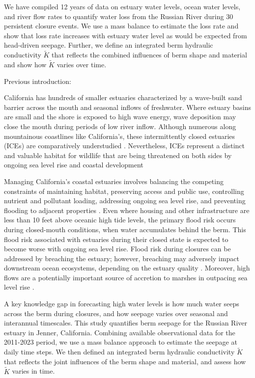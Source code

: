 \documentclass[preprint,12pt,authoryear]{elsarticle}
\begin{document}
We have compiled 12 years of data on estuary water levels, ocean water levels, and river flow rates to quantify water loss from the Russian River during 30 persistent closure events. We use a mass balance to estimate the loss rate and show that loss rate increases with estuary water level as would be expected from head-driven seepage. Further, we define an integrated berm hydraulic conductivity $\tilde K$ that reflects the combined influences of berm shape and material and show how $\tilde K$ varies over time.


Previous introduction:

California has hundreds of smaller estuaries characterized by a wave-built sand barrier across the mouth and seasonal inflows of freshwater. 
Where estuary basins are small and the shore is exposed to high wave energy, wave deposition may close the mouth during periods of low river inflow.
Although numerous along mountainous coastlines like California's, these intermittently closed estuaries (ICEs) are comparatively understudied \citep{largier2023recognizing}.
Nevertheless, ICEs represent a distinct and valuable habitat for wildlife
that are being threatened on both sides by ongoing sea level rise and coastal development

Managing California’s coastal estuaries involves balancing the competing constraints of maintaining habitat, preserving access and public use, controlling nutrient and pollutant loading, addressing ongoing sea level rise, and preventing flooding to adjacent properties \cite{thorne2017coastal}.
Even where housing and other infrastructure are less than 10 feet above oceanic high tide levels, the primary flood risk occurs during closed-mouth conditions, when water accumulates behind the berm. 
This flood risk associated with estuaries during their closed state is expected to become worse with ongoing sea level rise.
Flood risk during closures can be addressed by breaching the estuary; however, breaching may adversely impact downstream ocean ecosystems, depending on the estuary quality \cite{slinger2017modes}. Moreover, high flows are a potentially important source of accretion to marshes in outpacing sea level rise \citep{thorne2021wetlands}.

 A key knowledge gap in forecasting high water levels is how much water seeps across the berm during closures, and how seepage varies over seasonal and interannual timescales.
This study quantifies berm seepage for the Russian River estuary in Jenner, California. Combining available observational data for the 2011-2023 period, we use a mass balance approach to estimate the seepage at daily time steps. We then defined an integrated berm hydraulic conductivity $\tilde K$  that reflects the joint influences of the berm shape and material, and assess how $\tilde K$ varies in time.
\end{document}
